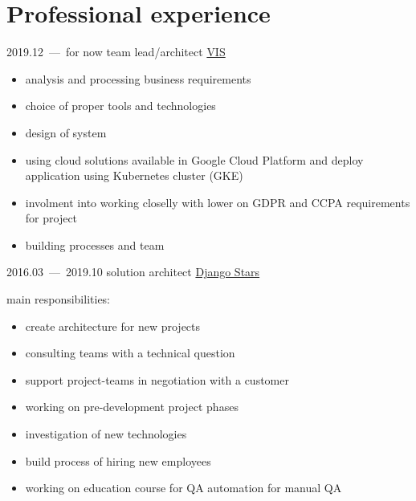 \documentclass[11pt,a4paper,oneside]{moderncv}
\begin{document}
    \section{Professional experience}

        \cventry
            {2019.12~---~for now}
            {team lead/architect}
            {\href{http://vetintegrations.com/}{VIS}}
            {}{}
            {
                \begin{itemize}
                  \item analysis and processing business requirements
                  \item choice of proper tools and technologies
                  \item design of system
                  \item using cloud solutions available in Google Cloud Platform and deploy application using Kubernetes cluster (GKE)
                  \item involment into working closelly with lower on GDPR and CCPA requirements for project
                  \item building processes and team
                \end{itemize}
            }

        \cventry
            {2016.03~---~2019.10}
            {solution architect}
            {\href{http://djangostars.com}{Django Stars}}
            {}{}
            {
              main responsibilities:
              \begin{itemize}
                \item create architecture for new projects
                \item consulting teams with a technical question
                \item support project-teams in negotiation with a customer
                \item working on pre-development project phases
                \item investigation of new technologies
                \item build process of hiring new employees
                \item working on education course for QA automation for manual QA
              \end{itemize}
            }
\end{document}
